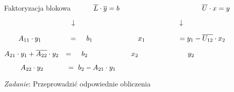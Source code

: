 \begin{frame}{Faktoryzacja blokowa}
$\hspace*{10mm} \overline{L}\cdot\overline{y}=b\  \hspace*{40mm}\overline{U}\cdot x=y$

$\hspace*{33.5mm}\downarrow\ \hspace*{51mm} \downarrow$

$\hspace*{7mm}A_{11}\cdot y_{1}\ \hspace*{12.4mm} =\ \hspace*{3mm} b_{1}\ \hspace*{21.5mm} x_{1}\ \hspace*{15mm} = y_{1}-\overline{U_{12}}\cdot x_{2}$

$A_{21}\cdot y_{1}+\overline{A_{22}}\cdot y_{2}\hspace*{2.5mm} =\ \hspace*{3mm} b_{2}\ \hspace*{20.5mm} x_{2}\ \hspace*{23.5mm} y_{2} $

$\hspace*{8mm} A_{22}\cdot y_{2} \hspace*{11.5mm} =\ b_{2}-A_{21}\cdot y_{1}\ $


\begin{flushright}
{\it Zadanie}: Przeprowadzić odpowiednie obliczenia
\end{flushright}

\end{frame}